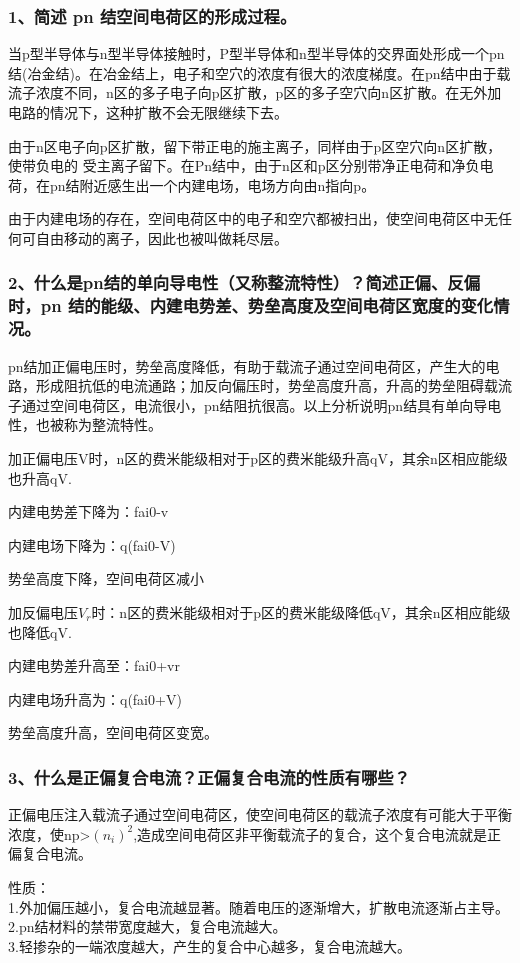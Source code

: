 \documentclass[cn,11pt]{elegantbook}
\begin{document}
\subsubsection*{1、简述 pn 结空间电荷区的形成过程。}

当p型半导体与n型半导体接触时，P型半导体和n型半导体的交界面处形成一个pn结(冶金结)。在冶金结上，电子和空穴的浓度有很大的浓度梯度。在pn结中由于载流子浓度不同，n区的多子电子向p区扩散，p区的多子空穴向n区扩散。在无外加电路的情况下，这种扩散不会无限继续下去。

由于n区电子向p区扩散，留下带正电的施主离子，同样由于p区空穴向n区扩散，使带负电的
受主离子留下。在Pn结中，由于n区和p区分别带净正电荷和净负电荷，在pn结附近感生出一个内建电场，电场方向由n指向p。

由于内建电场的存在，空间电荷区中的电子和空穴都被扫出，使空间电荷区中无任何可自由移动的离子，因此也被叫做耗尽层。
\subsubsection*{2、什么是pn结的单向导电性（又称整流特性）？简述正偏、反偏时，pn 结的能级、内建电势差、势垒高度及空间电荷区宽度的变化情况。}
pn结加正偏电压时，势垒高度降低，有助于载流子通过空间电荷区，产生大的电路，形成阻抗低的电流通路；加反向偏压时，势垒高度升高，升高的势垒阻碍载流子通过空间电荷区，电流很小，pn结阻抗很高。以上分析说明pn结具有单向导电性，也被称为整流特性。

加正偏电压V时，n区的费米能级相对于p区的费米能级升高qV，其余n区相应能级也升高qV.

内建电势差下降为：fai0-v

内建电场下降为：q(fai0-V)

势垒高度下降，空间电荷区减小

加反偏电压$V_{r}$时：n区的费米能级相对于p区的费米能级降低qV，其余n区相应能级也降低qV.

内建电势差升高至：fai0+vr

内建电场升高为：q(fai0+V)

势垒高度升高，空间电荷区变宽。
\subsubsection*{3、什么是正偏复合电流？正偏复合电流的性质有哪些？}

正偏电压注入载流子通过空间电荷区，使空间电荷区的载流子浓度有可能大于平衡浓度，使np>$(n_{i})^{2}$,造成空间电荷区非平衡载流子的复合，这个复合电流就是正偏复合电流。

性质：\\
1.外加偏压越小，复合电流越显著。随着电压的逐渐增大，扩散电流逐渐占主导。\\
2.pn结材料的禁带宽度越大，复合电流越大。\\
3.轻掺杂的一端浓度越大，产生的复合中心越多，复合电流越大。
\end{document}
